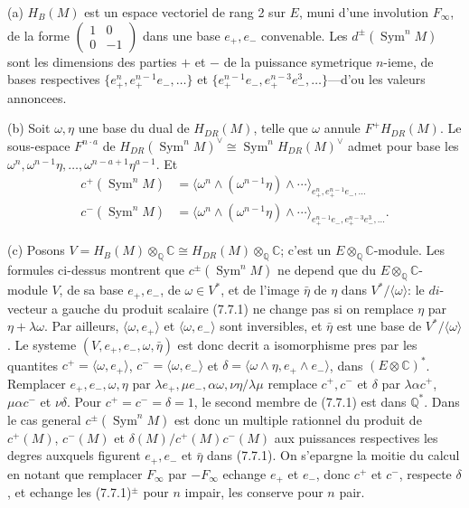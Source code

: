 \documentclass[12pt,a4paper]{article}
\theoremstyle{plain}
\theoremstyle{definition}
\theoremstyle{remark}
\DeclareMathOperator{\Sym}{Sym}
\newcommand{\Q}{\mathbb{Q}}
\newcommand{\C}{\mathbb{C}}
\begin{document}
(a) $H_B(M)$ est un espace vectoriel de rang 2 sur $E$, muni d'une involution $F_\infty$,
de la forme $\begin{pmatrix} 1 & 0 \\ 0 & -1 \end{pmatrix}$ dans une base $e_+, e_-$ convenable. Les
$d^\pm(\Sym^n M)$ sont les dimensions des parties $+$ et $-$ de la puissance symetrique
$n$-ieme, de bases respectives
$\{e_+^n, e_+^{n-1}e_-, \ldots\}$ et $\{e_+^{n-1}e_-, e_+^{n-3}e_-^3, \ldots\}$---d'ou les valeurs annoncees.

(b) Soit $\omega, \eta$ une base du dual de $H_{DR}(M)$, telle que $\omega$ annule $F^+ H_{DR}(M)$. Le
sous-espace $F^{n \cdot a}$ de $H_{DR}(\Sym^n M)^\vee \cong \Sym^n H_{DR}(M)^\vee$ admet pour base
les $\omega^n, \omega^{n-1}\eta, \ldots, \omega^{n-a+1}\eta^{a-1}$. Et
\begin{align*}
c^+(\Sym^n M) &= \langle \omega^n \wedge (\omega^{n-1}\eta) \wedge \cdots \rangle_{e_+^n, e_+^{n-1}e_-, \ldots} \\
c^-(\Sym^n M) &= \langle \omega^n \wedge (\omega^{n-1}\eta) \wedge \cdots \rangle_{e_+^{n-1}e_-, e_+^{n-3}e_-^3, \ldots}. \tag{7.7.1} \label{eq:7.7.1}
\end{align*}

(c) Posons $V = H_B(M) \otimes_\Q \C \cong H_{DR}(M) \otimes_\Q \C$; c'est un
$E \otimes_\Q \C$-module. Les formules ci-dessus montrent que $c^\pm(\Sym^n M)$ ne
depend que du $E \otimes_\Q \C$-module $V$, de sa base $e_+, e_-$, de $\omega \in V^*$, et de
l'image $\bar{\eta}$ de $\eta$ dans $V^*/\langle \omega \rangle$: le $di$-vecteur a gauche du produit
scalaire (7.7.1) ne change pas si on remplace $\eta$ par $\eta + \lambda\omega$. Par ailleurs,
$\langle \omega, e_+ \rangle$ et $\langle \omega, e_- \rangle$ sont inversibles, et $\bar{\eta}$ est une base de
$V^*/\langle \omega \rangle$. Le systeme $(V, e_+, e_-, \omega, \bar{\eta})$ est donc decrit a isomorphisme pres
par les quantites $c^+ = \langle \omega, e_+ \rangle$, $c^- = \langle \omega, e_- \rangle$ et
$\delta = \langle \omega \wedge \eta, e_+ \wedge e_- \rangle$, dans $(E \otimes \C)^*$. Remplacer $e_+, e_-,
\omega, \eta$ par $\lambda e_+, \mu e_-, \alpha \omega, \nu \eta/\lambda\mu$ remplace $c^+, c^-$ et $\delta$ par
$\lambda\alpha c^+$, $\mu\alpha c^-$ et $\nu\delta$. Pour $c^+ = c^- = \delta = 1$, le second membre de
(7.7.1) est dans $\Q^*$. Dans le cas general $c^\pm(\Sym^n M)$ est donc un multiple
rationnel du produit de $c^+(M)$, $c^-(M)$ et $\delta(M)/c^+(M)c^-(M)$ aux puissances
respectives les degres auxquels figurent $e_+, e_-$ et $\bar{\eta}$ dans (7.7.1). On s'epargne
la moitie du calcul en notant que remplacer $F_\infty$ par $-F_\infty$ echange $e_+$ et
$e_-$, donc $c^+$ et $c^-$, respecte $\delta$, et echange les (7.7.1)$^\pm$ pour $n$
impair, les conserve pour $n$ pair.
\end{document}
